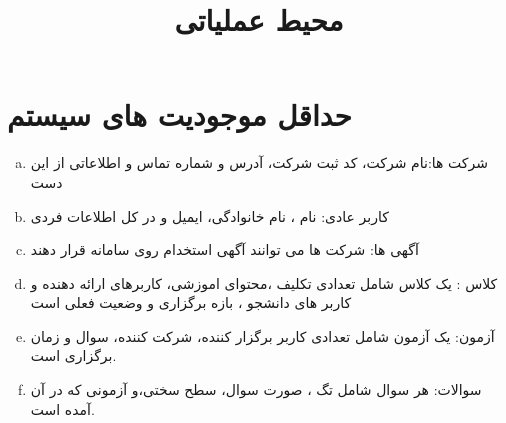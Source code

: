 \documentclass{article}
\date{}
\title{ محیط عملیاتی }
\begin{document}
\maketitle
\section{حداقل موجودیت های سیستم}
    \begin{enumerate}[a.]
        \item شرکت ها:نام شرکت، کد ثبت شرکت، آدرس و شماره تماس و اطلاعاتی از این دست
        \item کاربر عادی: نام ، نام خانوادگی، ایمیل و در کل اطلاعات فردی
        \item آگهی ها: شرکت ها می توانند آگهی استخدام روی سامانه قرار دهند
        \item کلاس : یک کلاس شامل تعدادی تکلیف ،محتوای اموزشی، کاربرهای ارائه دهنده و کاربر های دانشجو ، بازه برگزاری و وضعیت فعلی است
        \item آزمون: یک آزمون شامل تعدادی کاربر برگزار کننده، شرکت کننده، سوال و زمان برگزاری است.
        \item سوالات: هر سوال شامل تگ ، صورت سوال، سطح سختی،و آزمونی که در آن آمده است.
    \end{enumerate}
\end{document}
